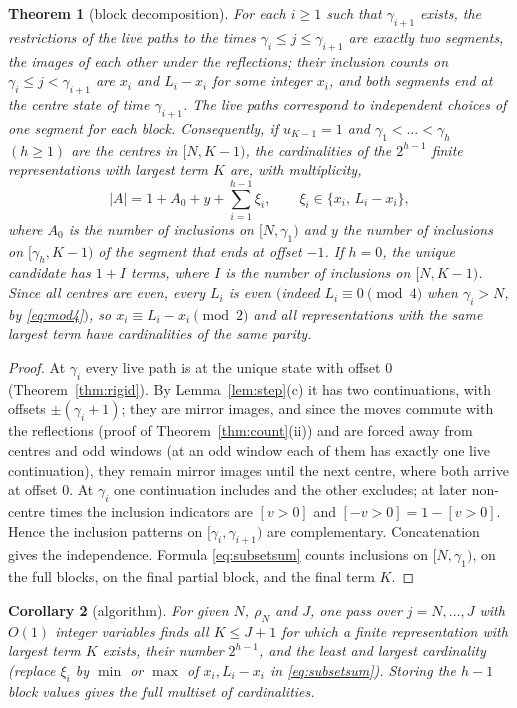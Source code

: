 \documentclass[11pt]{amsart}
\newtheorem{theorem}{Theorem}[section]
\newtheorem{corollary}[theorem]{Corollary}
\theoremstyle{definition}
\theoremstyle{remark}
\begin{document}
\begin{theorem}[block decomposition]\label{thm:blocks}
For each $i\ge1$ such that $\gamma_{i+1}$ exists, the restrictions of the live paths to the times $\gamma_i\le j\le\gamma_{i+1}$ are exactly two segments, the images of each other under the reflections; their inclusion counts on $\gamma_i\le j<\gamma_{i+1}$ are $x_i$ and $L_i-x_i$ for some integer $x_i$, and both segments end at the centre state of time $\gamma_{i+1}$. The live paths correspond to independent choices of one segment for each block. Consequently, if $u_{K-1}=1$ and $\gamma_1<\dots<\gamma_h$ $(h\ge1)$ are the centres in $[N,K-1)$, the cardinalities of the $2^{h-1}$ finite representations with largest term $K$ are, with multiplicity,
\begin{equation}\label{eq:subsetsum}
|A|=1+A_0+y+\sum_{i=1}^{h-1}\xi_i,\qquad \xi_i\in\{x_i,\,L_i-x_i\},
\end{equation}
where $A_0$ is the number of inclusions on $[N,\gamma_1)$ and $y$ the number of inclusions on $[\gamma_h,K-1)$ of the segment that ends at offset $-1$. If $h=0$, the unique candidate has $1+I$ terms, where $I$ is the number of inclusions on $[N,K-1)$. Since all centres are even, every $L_i$ is even $($indeed $L_i\equiv0\pmod 4$ when $\gamma_i>N$, by \eqref{eq:mod4}$)$, so $x_i\equiv L_i-x_i\pmod 2$ and all representations with the same largest term have cardinalities of the same parity.
\end{theorem}

\begin{proof}
At $\gamma_i$ every live path is at the unique state with offset $0$ (Theorem~\ref{thm:rigid}). By Lemma~\ref{lem:step}(c) it has two continuations, with offsets $\pm(\gamma_i+1)$; they are mirror images, and since the moves commute with the reflections (proof of Theorem~\ref{thm:count}(ii)) and are forced away from centres and odd windows (at an odd window each of them has exactly one live continuation), they remain mirror images until the next centre, where both arrive at offset $0$. At $\gamma_i$ one continuation includes and the other excludes; at later non-centre times the inclusion indicators are $[v>0]$ and $[-v>0]=1-[v>0]$. Hence the inclusion patterns on $[\gamma_i,\gamma_{i+1})$ are complementary. Concatenation gives the independence. Formula \eqref{eq:subsetsum} counts inclusions on $[N,\gamma_1)$, on the full blocks, on the final partial block, and the final term $K$.
\end{proof}

\begin{corollary}[algorithm]\label{cor:alg}
For given $N$, $\rho_N$ and $J$, one pass over $j=N,\dots,J$ with $O(1)$ integer variables finds all $K\le J+1$ for which a finite representation with largest term $K$ exists, their number $2^{h-1}$, and the least and largest cardinality (replace $\xi_i$ by $\min$ or $\max$ of $x_i,L_i-x_i$ in \eqref{eq:subsetsum}). Storing the $h-1$ block values gives the full multiset of cardinalities.
\end{corollary}
\end{document}
